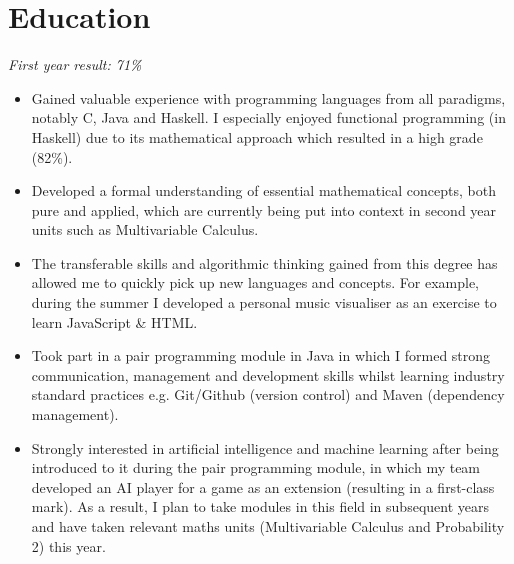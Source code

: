 \documentclass{cvclass}
\begin{document}
\titlespacing*{\subsection}{0pt}{\baselineskip}{1pt}
\address{Flat 7, 5-6 Clifton Down Road, Bristol, BS8 4AG}
\address{Email: sv17490@bristol.ac.uk, Mobile: 07908911995}
\address{Github: www.github.com/sollyvarcoe}
\section{Education}
\newline
\indent\indent\textit{First year result: 71\%}
\begin{itemize}
  \item Gained valuable experience with programming languages from all paradigms, notably C, Java and Haskell. I especially enjoyed functional programming (in Haskell) due to its mathematical approach which resulted in a high grade (82\%).
  \item Developed a formal understanding of essential mathematical concepts, both pure and applied, which are currently being put into context in second year units such as Multivariable Calculus.
  \item The transferable skills and algorithmic thinking gained from this degree has allowed me to quickly pick up new languages and concepts. For example, during the summer I developed a personal music visualiser as an exercise to learn JavaScript \& HTML.
  \item Took part in a pair programming module in Java in which I formed strong communication, management and development skills whilst learning industry standard practices e.g. Git/Github (version control) and Maven (dependency management).
  \item Strongly interested in artificial intelligence and machine learning after being introduced to it during the pair programming module, in which my team developed an AI player for a game as an extension (resulting in a first-class mark). As a result, I plan to take modules in this field in subsequent years and have taken relevant maths units (Multivariable Calculus and Probability 2) this year.

\end{itemize}
\newline
{}\newline
{}\newline
\end{document}
